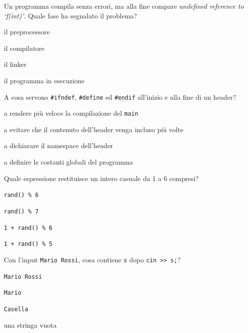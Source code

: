 \begin{quiz}{Un programma compila senza errori, ma alla fine compare \emph{undefined reference to `f(int)'}. Quale fase ha segnalato il problema?}
  \item il preprocessore
  \item il compilatore
  \item il linker
  \item il programma in esecuzione
\end{quiz}

\begin{quiz}{A cosa servono \texttt{\#ifndef}, \texttt{\#define} ed \texttt{\#endif} all'inizio e alla fine di un header?}
  \item a rendere più veloce la compilazione del \texttt{main}
  \item a evitare che il contenuto dell'header venga incluso più volte
  \item a dichiarare il namespace dell'header
  \item a definire le costanti globali del programma
\end{quiz}

\begin{quiz}{Quale espressione restituisce un intero casuale da 1 a 6 compresi?}
  \item \texttt{rand() \% 6}
  \item \texttt{rand() \% 7}
  \item \texttt{1 + rand() \% 6}
  \item \texttt{1 + rand() \% 5}
\end{quiz}

\begin{quiz}{Con l'input \texttt{Mario Rossi}, cosa contiene \texttt{s} dopo \texttt{cin >> s;}?}
  \item \texttt{Mario Rossi}
  \item \texttt{Mario}
  \item \texttt{Casella}
  \item una stringa vuota
\end{quiz}

